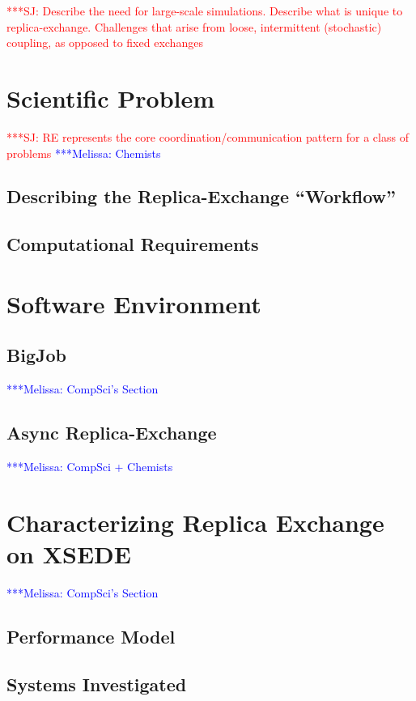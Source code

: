 \documentclass{sig-alternate}
\newcommand{\jhanote}[1]{ {\textcolor{red} { ***SJ: #1 }}}
\newcommand{\mrnote}[1]{ {\textcolor{blue} { ***Melissa: #1 }}}
\newcommand{\jhanote}[1]{}
\begin{document}
\jhanote{Describe the need for large-scale simulations. Describe what
  is unique to replica-exchange. Challenges that arise from loose,
  intermittent (stochastic) coupling, as opposed to fixed exchanges}

\section{Scientific Problem}\label{sec:requirements}

\jhanote{RE represents the core coordination/communication pattern for
  a class of problems}
\mrnote{Chemists}

\subsection{Describing the Replica-Exchange ``Workflow'' } \label{}

\subsection{Computational Requirements}

\section{Software Environment}

\subsection{BigJob}
\mrnote{CompSci's Section}

\subsection{Async Replica-Exchange}
\mrnote{CompSci + Chemists}

\section{Characterizing Replica Exchange on XSEDE }\label{sec:results}
\mrnote{ CompSci's Section}

\subsection{Performance Model}

\subsection{Systems Investigated} 
\end{document}
